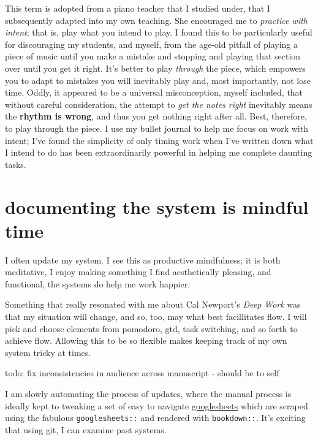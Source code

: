 \documentclass[]{book}
\begin{document}
This term is adopted from a piano teacher that I studied under, that I subsequently adapted into my own teaching. She encouraged me to \emph{practice with intent}; that is, play what you intend to play. I found this to be particularly useful for discouraging my students, and myself, from the age-old pitfall of playing a piece of music until you make a mistake and stopping and playing that section over until you get it right. It's better to play \emph{through} the piece, which empowers you to adapt to mistakes you will inevitably play and, most importantly, not lose time. Oddly, it appeared to be a universal misconception, myself included, that without careful consideration, the attempt to \emph{get the notes right} inevitably means the \textbf{rhythm is wrong}, and thus you get nothing right after all. Best, therefore, to play through the piece. I use my bullet journal to help me focus on work with intent; I've found the simplicity of only timing work when I've written down what I intend to do has been extraordinarily powerful in helping me complete daunting tasks.

\hypertarget{mindfulness}{%
\section{documenting the system is mindful time}\label{mindfulness}}

I often update my system. I see this as productive mindfulness; it is both meditative, I enjoy making something I find aesthetically pleasing, and functional, the systems do help me work happier.

Something that really resonated with me about Cal Newport's \emph{Deep Work} was that my situation will change, and so, too, may what best facillitates flow. I will pick and choose elements from pomodoro, gtd, task switching, and so forth to achieve flow. Allowing this to be so flexible makes keeping track of my own system tricky at times.

todo: fix inconsistencies in audience across manuscript - should be to self

I am slowly automating the process of updates, where the manual process is ideally kept to tweaking a set of easy to navigate \href{https://docs.google.com/spreadsheets/d/1hv7pkBGu8XQQOIBbBt1_1LvKGBR7zTdQYCzogrv3hz0/edit?usp=sharing}{googlesheets} which are scraped using the fabulous \texttt{googlesheets::} and rendered with \texttt{bookdown::}. It's exciting that using git, I can examine past systems.
\end{document}
